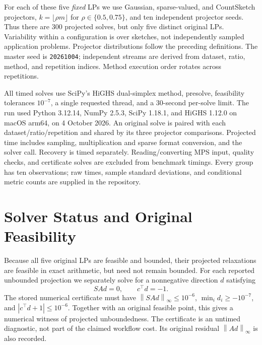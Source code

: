 \documentclass[12pt,letterpaper,oneside]{report}
\theoremstyle{definition}
\newcommand{\norm}[1]{\left\lVert #1\right\rVert}
\begin{document}
For each of these five \emph{fixed} LPs we use Gaussian, sparse-valued,
and CountSketch projectors, $k=\lfloor\rho m\rfloor$ for
$\rho\in\{0.5,0.75\}$, and ten independent projector seeds. Thus there
are 300 projected solves, but only five distinct original LPs. Variability
within a configuration is over sketches, not independently sampled
application problems. Projector distributions follow the preceding
definitions. The master seed is \texttt{20261004}; independent streams
are derived from dataset, ratio, method, and repetition indices.
Method execution order rotates across repetitions.

All timed solves use SciPy's HiGHS dual-simplex method, presolve, feasibility
tolerances $10^{-7}$, a single requested thread, and a 30-second per-solve
limit. The run used Python 3.12.14, NumPy 2.5.3, SciPy 1.18.1, and HiGHS
1.12.0 on macOS arm64, on 4 October 2026. An original solve is paired
with each dataset/ratio/repetition and shared by its three projector
comparisons. Projected time includes sampling, multiplication and sparse
format conversion, and the solver call. Recovery is timed separately.
Reading/converting MPS input, quality checks, and certificate solves are
excluded from benchmark timings. Every group has ten observations;
raw times, sample standard deviations, and conditional metric counts
are supplied in the repository.

\section{Solver Status and Original Feasibility}
Because all five original LPs are feasible and bounded, their projected
relaxations are feasible in exact arithmetic, but need not remain bounded.
For each reported unbounded projection we separately solve for a
nonnegative direction $d$ satisfying
\[
SA d=0,\qquad c^\top d=-1.
\]
The stored numerical certificate must have
$\norm{SA d}_\infty\leq10^{-6}$, $\min_i d_i\geq-10^{-7}$, and
$|c^\top d+1|\leq10^{-6}$. Together with an original feasible point,
this gives a numerical witness of projected unboundedness. The
certificate is an untimed diagnostic, not part of the claimed workflow
cost. Its original residual $\norm{Ad}_\infty$ is also recorded.
\end{document}
